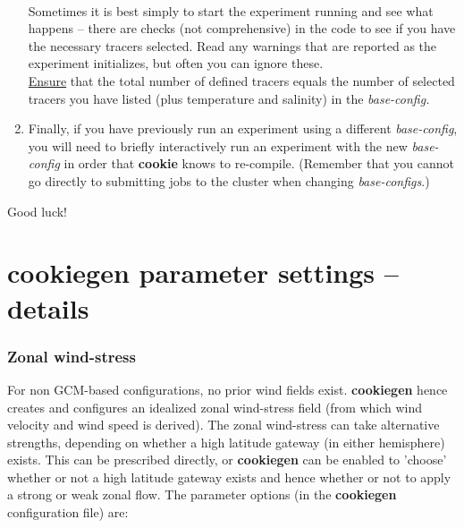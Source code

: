 \begin{enumerate}[noitemsep]
\vspace{1mm}
\\ Sometimes it is best simply to start the experiment running and see what happens -- there are checks (not comprehensive) in the code to see if you have the necessary tracers selected. Read any warnings that are reported as the experiment initializes, but often you can ignore these.
\\\uline{Ensure} that the total number of defined tracers equals the number of selected tracers you have listed (plus temperature and salinity) in the \textit{base-config.}
\vspace{1mm}
\item Finally, if you have previously run an experiment using a different \textit{base-config}, you will need to briefly interactively run an experiment with the new \textit{base-config} in order that \textbf{cookie} knows to re-compile. (Remember that you cannot go directly to submitting jobs to the cluster when changing \textit{base-configs}.)
\end{enumerate}

\vspace{2mm}
Good luck!


\newpage

\section{cookiegen parameter settings -- details}


\subsubsection{Zonal wind-stress}

For non GCM-based configurations, no prior wind fields exist. \textbf{cookiegen} hence creates and configures an idealized zonal wind-stress field (from which wind velocity and wind speed is derived). The zonal wind-stress can take alternative strengths, depending on whether a high latitude gateway (in either hemisphere) exists. This can be prescribed directly, or \textbf{cookiegen} can be enabled to 'choose' whether or not a high latitude gateway exists and hence whether or not to apply a strong or weak zonal flow. The parameter options (in the \textbf{cookiegen} configuration file) are:

